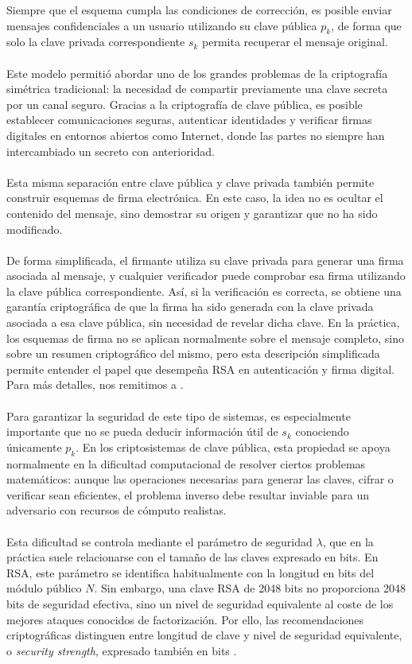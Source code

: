 Siempre que el esquema cumpla las condiciones de corrección, es posible enviar mensajes confidenciales a un usuario utilizando su clave pública $p_k$, de forma que solo la clave privada correspondiente $s_k$ permita recuperar el mensaje original.
\\
\\
Este modelo permitió abordar uno de los grandes problemas de la criptografía simétrica tradicional: la necesidad de compartir previamente una clave secreta por un canal seguro. Gracias a la criptografía de clave pública, es posible establecer comunicaciones seguras, autenticar identidades y verificar firmas digitales en entornos abiertos como Internet, donde las partes no siempre han intercambiado un secreto con anterioridad.
\\
\\
Esta misma separación entre clave pública y clave privada también permite construir esquemas de firma electrónica. En este caso, la idea no es ocultar el contenido del mensaje, sino demostrar su origen y garantizar que no ha sido modificado.
\\
\\
De forma simplificada, el firmante utiliza su clave privada para generar una firma asociada al mensaje, y cualquier verificador puede comprobar esa firma utilizando la clave pública correspondiente. Así, si la verificación es correcta, se obtiene una garantía criptográfica de que la firma ha sido generada con la clave privada asociada a esa clave pública, sin necesidad de revelar dicha clave. En la práctica, los esquemas de firma no se aplican normalmente sobre el mensaje completo, sino sobre un resumen criptográfico del mismo, pero esta descripción simplificada permite entender el papel que desempeña RSA en autenticación y firma digital. Para más detalles, nos remitimos a \cite{menezes1996handbook}.
\\
\\
Para garantizar la seguridad de este tipo de sistemas, es especialmente importante que no se pueda deducir información útil de $s_k$ conociendo únicamente $p_k$. En los criptosistemas de clave pública, esta propiedad se apoya normalmente en la dificultad computacional de resolver ciertos problemas matemáticos: aunque las operaciones necesarias para generar las claves, cifrar o verificar sean eficientes, el problema inverso debe resultar inviable para un adversario con recursos de cómputo realistas.
\\
\\
Esta dificultad se controla mediante el parámetro de seguridad $\lambda$, que en la práctica suele relacionarse con el tamaño de las claves expresado en bits. En RSA, este parámetro se identifica habitualmente con la longitud en bits del módulo público $N$. Sin embargo, una clave RSA de 2048 bits no proporciona 2048 bits de seguridad efectiva, sino un nivel de seguridad equivalente al coste de los mejores ataques conocidos de factorización. Por ello, las recomendaciones criptográficas distinguen entre longitud de clave y nivel de seguridad equivalente, o \textit{security strength}, expresado también en bits \citep{nist80057pt1r5}.
